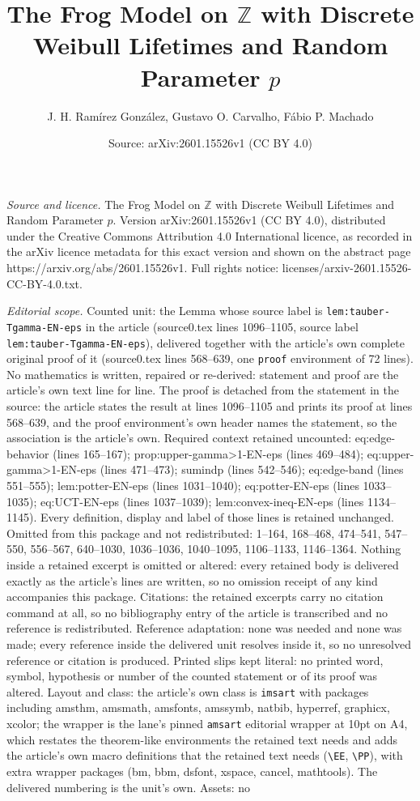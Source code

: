 \documentclass[10pt,a4paper]{amsart}
\title[The Frog Model on $\mathbb{Z}$ with Discrete Weibull Lifetim]{The Frog Model on $\mathbb{Z}$ with Discrete Weibull Lifetimes and Random Parameter $p$}
\author{J. H. Ram\'irez Gonz\'alez, Gustavo O. Carvalho, F\'abio P. Machado}
\date{Source: arXiv:2601.15526v1 (CC BY 4.0)}
\begin{document}
\maketitle

\noindent\emph{Source and licence.} The Frog Model on $\mathbb{Z}$ with Discrete Weibull Lifetimes and Random Parameter $p$. Version arXiv:2601.15526v1 (CC BY 4.0), distributed under the Creative Commons Attribution 4.0 International licence, as recorded in the arXiv licence metadata for this exact version and shown on the abstract page https://arxiv.org/abs/2601.15526v1. Full rights notice: licenses/arxiv-2601.15526-CC-BY-4.0.txt.\par\smallskip

\noindent\textit{Editorial scope.} Counted unit: the Lemma whose source label is \texttt{lem:tauber-Tgamma-EN-eps} in the article (source0.tex lines 1096--1105, source label \texttt{lem:tauber-Tgamma-EN-eps}), delivered together with the article's own complete original proof of it (source0.tex lines 568--639, one \texttt{proof} environment of 72 lines). No mathematics is written, repaired or re-derived: statement and proof are the article's own text line for line. The proof is detached from the statement in the source: the article states the result at lines 1096--1105 and prints its proof at lines 568--639, and the proof environment's own header names the statement, so the association is the article's own. Required context retained uncounted: eq:edge-behavior (lines 165--167); prop:upper-gamma>1-EN-eps (lines 469--484); eq:upper-gamma>1-EN-eps (lines 471--473); sumindp (lines 542--546); eq:edge-band (lines 551--555); lem:potter-EN-eps (lines 1031--1040); eq:potter-EN-eps (lines 1033--1035); eq:UCT-EN-eps (lines 1037--1039); lem:convex-ineq-EN-eps (lines 1134--1145). Every definition, display and label of those lines is retained unchanged. Omitted from this package and not redistributed: 1--164, 168--468, 474--541, 547--550, 556--567, 640--1030, 1036--1036, 1040--1095, 1106--1133, 1146--1364. Nothing inside a retained excerpt is omitted or altered: every retained body is delivered exactly as the article's lines are written, so no omission receipt of any kind accompanies this package. Citations: the retained excerpts carry no citation command at all, so no bibliography entry of the article is transcribed and no reference is redistributed. Reference adaptation: none was needed and none was made; every reference inside the delivered unit resolves inside it, so no unresolved reference or citation is produced. Printed slips kept literal: no printed word, symbol, hypothesis or number of the counted statement or of its proof was altered. Layout and class: the article's own class is \texttt{imsart} with packages including amsthm, amsmath, amsfonts, amssymb, natbib, hyperref, graphicx, xcolor; the wrapper is the lane's pinned \texttt{amsart} editorial wrapper at 10pt on A4, which restates the theorem-like environments the retained text needs and adds the article's own macro definitions that the retained text needs (\texttt{\textbackslash EE}, \texttt{\textbackslash PP}), with extra wrapper packages (bm, bbm, dsfont, xspace, cancel, mathtools). The delivered numbering is the unit's own. Assets: no 
\end{document}
